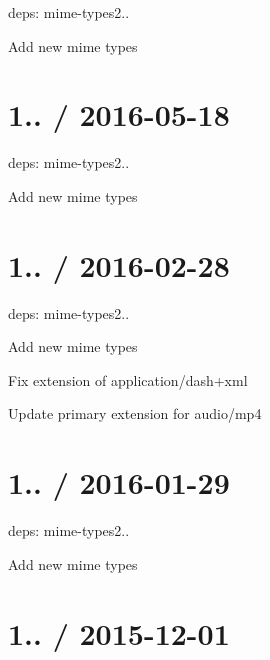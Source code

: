 \begin{DoxyItemize}
\item deps\+: mime-\/types2..
\begin{DoxyItemize}
\item Add new mime types
\end{DoxyItemize}
\end{DoxyItemize}

\section*{1.. / 2016-\/05-\/18 }


\begin{DoxyItemize}
\item deps\+: mime-\/types2..
\begin{DoxyItemize}
\item Add new mime types
\end{DoxyItemize}
\end{DoxyItemize}

\section*{1.. / 2016-\/02-\/28 }


\begin{DoxyItemize}
\item deps\+: mime-\/types2..
\begin{DoxyItemize}
\item Add new mime types
\item Fix extension of {\ttfamily application/dash+xml}
\item Update primary extension for {\ttfamily audio/mp4}
\end{DoxyItemize}
\end{DoxyItemize}

\section*{1.. / 2016-\/01-\/29 }


\begin{DoxyItemize}
\item deps\+: mime-\/types2..
\begin{DoxyItemize}
\item Add new mime types
\end{DoxyItemize}
\end{DoxyItemize}

\section*{1.. / 2015-\/12-\/01 }


